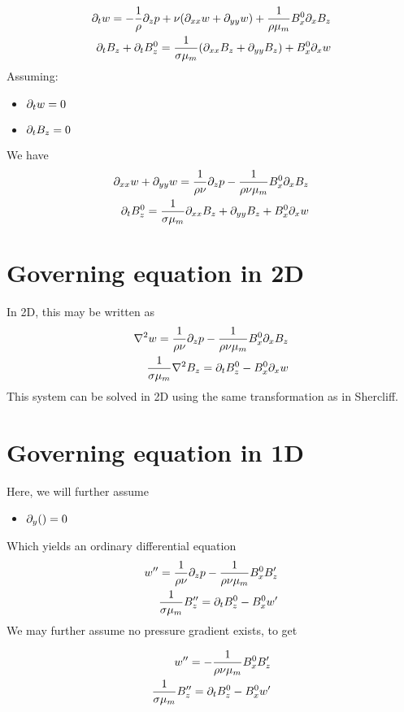 \documentclass[11pt]{article}
\begin{document}
\begin{equation}\begin{aligned}
\partial_t w = -\frac{1}{\rho}\partial_z p+ \nu (\partial_{xx}w+\partial_{yy}w) + \frac{1}{\rho {\mu_m}} B_x^0 \partial_x B_z \\
\partial_t B_z + \partial_t B_z^0 = \frac{1}{\sigma {\mu_m}} (\partial_{xx} B_z + \partial_{yy} B_z) + B_x^0 \partial_x w \\
\end{aligned} \end{equation}
Assuming:
\begin{itemize}\setlength\itemsep{-1em}
	\item $\partial_t w = 0$
	\item $\partial_t B_z = 0$
\end{itemize}
We have
\begin{equation}\begin{aligned}
\partial_{xx}w+\partial_{yy}w = \frac{1}{\rho \nu}\partial_z p - \frac{1}{\rho \nu {\mu_m}} B_x^0 \partial_x B_z \\
\partial_t B_z^0 = \frac{1}{\sigma {\mu_m}} \partial_{xx} B_z + \partial_{yy} B_z + B_x^0 \partial_x w \\
\end{aligned} \end{equation}
\section{Governing equation in 2D}
In 2D, this may be written as
\begin{equation}\begin{aligned}
\nabla^2 w = \frac{1}{\rho \nu} \partial_z p - \frac{1}{\rho \nu {\mu_m}} B_x^0 \partial_x B_z \\
\frac{1}{\sigma {\mu_m}} \nabla^2 B_z = \partial_t B_z^0 - B_x^0 \partial_x w \\
\end{aligned} \end{equation}
This system can be solved in 2D using the same transformation as in Shercliff.

\section{Governing equation in 1D}
Here, we will further assume
\begin{itemize}\setlength\itemsep{-1em}
	\item $\partial_y () = 0$
\end{itemize}
Which yields an ordinary differential equation
\begin{equation}\begin{aligned}
w'' = \frac{1}{\rho \nu} \partial_z p - \frac{1}{\rho \nu {\mu_m}} B_x^0 B_z' \\
\frac{1}{\sigma {\mu_m}} B_z'' = \partial_t B_z^0 - B_x^0 w' \\
\end{aligned} \end{equation}
We may further assume no pressure gradient exists, to get

\begin{equation}\begin{aligned}
w'' = - \frac{1}{\rho \nu {\mu_m}} B_x^0 B_z' \\
\frac{1}{\sigma {\mu_m}} B_z'' = \partial_t B_z^0 - B_x^0 w' \\
\end{aligned} \end{equation}
\end{document}
